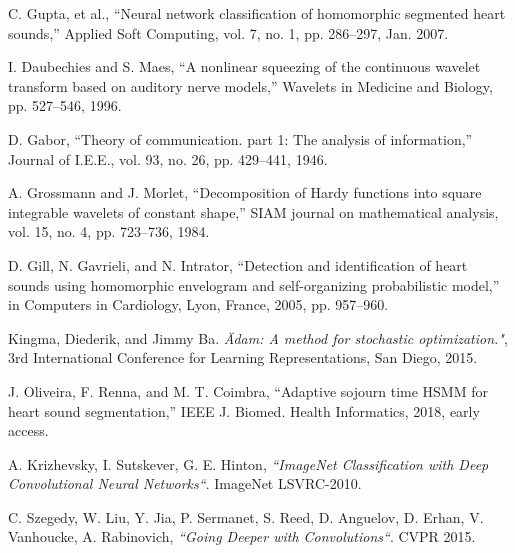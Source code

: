 \begin{thebibliography}{9}
  C. Gupta, et al., “Neural network classification of homomorphic
  segmented heart sounds,” Applied Soft Computing, vol. 7, no. 1, pp.
  286–297, Jan. 2007.

  I. Daubechies and S. Maes, “A nonlinear squeezing of the continuous wavelet transform based on auditory nerve
  models,” Wavelets in Medicine and Biology, pp. 527–546, 1996.

  D. Gabor, “Theory of communication. part 1: The analysis of information,” Journal of I.E.E., vol. 93, no. 26, pp.
  429–441, 1946.

  A. Grossmann and J. Morlet, “Decomposition of Hardy functions into square integrable wavelets of constant shape,”
  SIAM journal on mathematical analysis, vol. 15, no. 4, pp. 723–736, 1984.

  D. Gill, N. Gavrieli, and N. Intrator, “Detection and identification of heart sounds using homomorphic envelogram
  and self-organizing probabilistic model,” in Computers in Cardiology, Lyon, France, 2005, pp. 957–960.

  Kingma, Diederik, and Jimmy Ba. \textit{\" Adam: A method for stochastic optimization."}, 3rd International
  Conference for Learning Representations, San Diego, 2015.

  J. Oliveira, F. Renna, and M. T. Coimbra, “Adaptive sojourn time HSMM for heart sound segmentation,” IEEE J. Biomed.
  Health Informatics, 2018, early access.

  A. Krizhevsky, I. Sutskever, G. E. Hinton, \textit{``ImageNet Classification with Deep Convolutional
  Neural Networks``}. ImageNet LSVRC-2010.

  C. Szegedy, W. Liu, Y. Jia, P. Sermanet, S. Reed, D. Anguelov, D. Erhan, V. Vanhoucke, A. Rabinovich,
  \textit{``Going Deeper with Convolutions``}. CVPR 2015.
\end{thebibliography}
